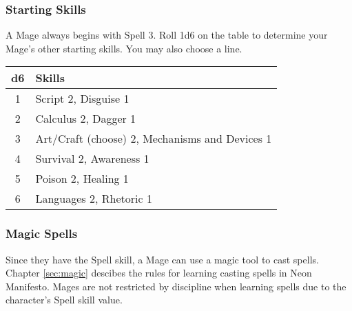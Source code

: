 \begin{multicols}{2}
\subsubsection*{Starting Skills}
A Mage always begins with Spell 3. Roll 1d6 on the table to determine your Mage's other starting skills. You may also choose a line.
\begin{adjustbox}{width=\columnwidth,center}
\begin{tabular}{|c|l|}
\hline
\textbf{d6} & \textbf{Skills} \\
\hline
1 & Script 2, Disguise 1 \\
2 & Calculus 2, Dagger 1 \\
3 & Art/Craft (choose) 2, Mechanisms and Devices 1 \\
4 & Survival 2, Awareness 1 \\
5 & Poison 2, Healing 1 \\
6 & Languages 2, Rhetoric 1 \\
\hline
\end{tabular}
\end{adjustbox}

\subsubsection*{Magic Spells}
Since they have the Spell skill, a Mage can use a magic tool to cast spells. Chapter \ref{sec:magic} descibes the rules for learning casting spells in Neon Manifesto. Mages are not restricted by discipline when learning spells due to the character's Spell skill value.

\end{multicols}

